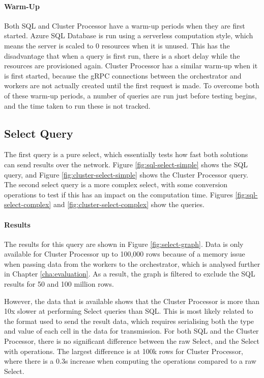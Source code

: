 \paragraph{Warm-Up}
Both SQL and Cluster Processor have a warm-up periods when they are first started. Azure SQL Database is run using a serverless computation style, which means the server is scaled to 0 resources when it is unused. This has the disadvantage that when a query is first run, there is a short delay while the resources are provisioned again. Cluster Processor has a similar warm-up when it is first started, because the gRPC connections between the orchestrator and workers are not actually created until the first request is made. To overcome both of these warm-up periods, a number of queries are run just before testing begins, and the time taken to run these is not tracked.



\subsection{Select Query}
The first query is a pure select, which essentially tests how fast both solutions can send results over the network. Figure \ref{fig:sql-select-simple} shows the SQL query, and Figure \ref{fig:cluster-select-simple} shows the Cluster Processor query. The second select query is a more complex select, with some conversion operations to test if this has an impact on the computation time. Figures \ref{fig:sql-select-complex} and \ref{fig:cluster-select-complex} show the queries.

\paragraph{Results} The results for this query are shown in Figure \ref{fig:select-graph}. Data is only available for Cluster Processor up to 100,000 rows because of a memory issue when passing data from the workers to the orchestrator, which is analysed further in Chapter \ref{cha:evaluation}. As a result, the graph is filtered to exclude the SQL results for 50 and 100 million rows.

However, the data that is available shows that the Cluster Processor is more than 10x slower at performing Select queries than SQL. This is most likely related to the format used to send the result data, which requires serialising both the type and value of each cell in the data for transmission. For both SQL and the Cluster Processor, there is no significant difference between the raw Select, and the Select with operations. The largest difference is at 100k rows for Cluster Processor, where there is a 0.3s increase when computing the operations compared to a raw Select.

